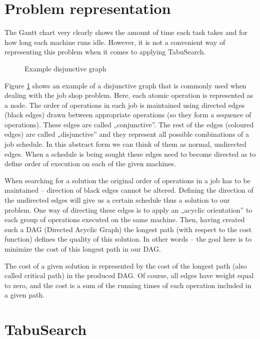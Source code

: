 \documentclass[14pt]{article}
\begin{document}
\section{Problem representation}

The Gantt chart very clearly shows the amount of time each task takes and for how long each machine runs idle. However, it is not a convenient way of representing this problem when it comes to applying TabuSearch.

\begin{figure}[H]
  \centering
  \def\svgwidth{0.5\columnwidth}
  
  \caption{Example disjunctive graph}
  \label{example-disjunctive}
\end{figure}

Figure \ref{example-disjunctive} shows an example of a disjunctive graph that is commonly used when dealing with the job shop problem. Here, each atomic operation is represented as a node. The order of operations in each job is maintained using directed edges (black edges) drawn between appropriate operations (so they form a sequence of operations). These edges are called „conjunctive”. The rest of the edges (coloured edges) are called „disjunctive” and they represent all possible combinations of a job schedule. In this abstract form we can think of them as normal, undirected edges. When a schedule is being sought these edges need to become directed as to define order of execution on each of the given machines.

When searching for a solution the original order of operations in a job has to be maintained – direction of black edges cannot be altered. Defining the direction of the undirected edges will give us a certain schedule thus a solution to our problem. One way of directing these edges is to apply an „acyclic orientation” to each group of operations executed on the same machine. Then, having created such a DAG (Directed Acyclic Graph) the longest path (with respect to the cost function) defines the quality of this solution. In other words – the goal here is to minimize the cost of this longest path in our DAG.

The cost of a given solution is represented by the cost of the longest path (also called critical path) in the produced DAG. Of course, all edges have weight equal to zero, and the cost is a sum of the running times of each operation included in a given path.

\section{TabuSearch}
\end{document}
